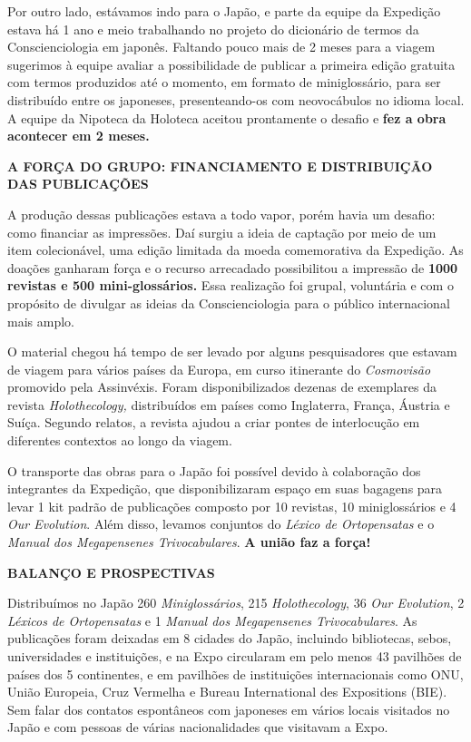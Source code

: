 Por outro lado, estávamos indo para o Japão, e parte da equipe da Expedição estava há 1 ano e meio trabalhando no projeto do dicionário de termos da Conscienciologia em japonês. Faltando pouco mais de 2 meses para a viagem sugerimos à equipe avaliar a possibilidade de publicar a primeira edição gratuita com termos produzidos até o momento, em formato de miniglossário, para ser distribuído entre os japoneses, presenteando-os com neovocábulos no idioma local. A equipe da Nipoteca da Holoteca aceitou prontamente o desafio e \textbf{fez a obra acontecer em 2 meses.}

\textbf{A FORÇA DO GRUPO: FINANCIAMENTO E DISTRIBUIÇÃO DAS PUBLICAÇÕES}

A produção dessas publicações estava a todo vapor, porém havia um desafio: como financiar as impressões. Daí surgiu a ideia de captação por meio de um item colecionável, uma edição limitada da moeda comemorativa da Expedição. As doações ganharam força e o recurso arrecadado possibilitou a impressão de \textbf{1000 revistas e 500 mini-glossários.} Essa realização foi grupal, voluntária e com o propósito de divulgar as ideias da Conscienciologia para o público internacional mais amplo.

O material chegou há tempo de ser levado por alguns pesquisadores que estavam de viagem para vários países da Europa, em curso itinerante do \emph{Cosmovisão} promovido pela Assinvéxis. Foram disponibilizados dezenas de exemplares da revista \emph{Holothecology,} distribuídos em países como Inglaterra, França, Áustria e Suíça. Segundo relatos, a revista ajudou a criar pontes de interlocução em diferentes contextos ao longo da viagem.

O transporte das obras para o Japão foi possível devido à colaboração dos integrantes da Expedição, que disponibilizaram espaço em suas bagagens para levar 1 kit padrão de publicações composto por 10 revistas, 10 miniglossários e 4 \emph{Our Evolution}. Além disso, levamos conjuntos do \emph{Léxico de Ortopensatas} e o \emph{Manual dos Megapensenes Trivocabulares}. \textbf{A união faz a força!}

\textbf{BALANÇO E PROSPECTIVAS}

Distribuímos no Japão 260 \emph{Miniglossários}, 215 \emph{Holothecology}, 36 \emph{Our Evolution}, 2 \emph{Léxicos de Ortopensatas} e 1 \emph{Manual dos Megapensenes Trivocabulares}. As publicações foram deixadas em 8 cidades do Japão, incluindo bibliotecas, sebos, universidades e instituições, e na Expo circularam em pelo menos 43 pavilhões de países dos 5 continentes, e em pavilhões de instituições internacionais como ONU, União Europeia, Cruz Vermelha e Bureau International des Expositions (BIE). Sem falar dos contatos espontâneos com japoneses em vários locais visitados no Japão e com pessoas de várias nacionalidades que visitavam a Expo.

